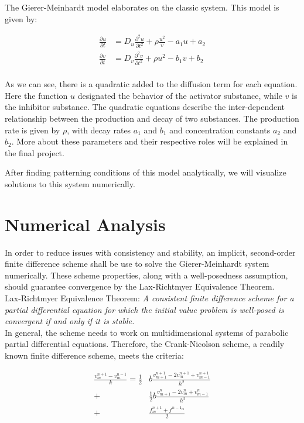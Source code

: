 \documentclass[12pt]{article}
\begin{document}
The Gierer-Meinhardt model elaborates on the classic system. This model is given by:

\begin{align*}
    \frac{\partial u}{\partial t} & = D_u\frac{\partial^2u}{\partial t^2} + \rho\frac{u^2}{v} - a_1u + a_2 \\
    \frac{\partial v}{\partial t} & = D_v\frac{\partial^2v}{\partial t^2} + \rho u^2 - b_1v + b_2 \\
\end{align*}

As we can see, there is a quadratic added to the diffusion term for each equation. Here the function $u$ designated the behavior of the activator substance, while $v$ is the inhibitor substance. The quadratic equations describe the inter-dependent relationship between the production and decay of two substances. The production rate is given by $\rho$, with decay rates $a_1$ and $b_1$ and concentration constants $a_2$ and $b_2$. More about these parameters and their respective roles will be explained in the final project.

After finding patterning conditions of this model analytically, we will visualize solutions to this system numerically.

\pagebreak

\section*{Numerical Analysis}

In order to reduce issues with consistency and stability, an implicit, second-order finite difference scheme shall be use to solve the Gierer-Meinhardt system numerically. These scheme properties, along with a well-posedness assumption, should guarantee convergence by the Lax-Richtmyer Equivalence Theorem. \\

Lax-Richtmyer Equivalence Theorem:
\textit{A consistent finite difference scheme for a partial differential equation for which the initial value problem is well-posed is convergent if and only if it is stable.} \cite{Strikwerda2004} \\

In general, the scheme needs to work on multidimensional systems of parabolic partial differential equations. Therefore, the Crank-Nicolson scheme, a readily known finite difference scheme, meets the criteria:


\begin{align*}
  \frac{v^{n+1}_m-v^{n-1}_m}{k}=\frac{1}{2} & b\frac{v^{n+1}_{m+1}-2v^{n+1}_{m}+v^{n+1}_{m-1}}{h^2} \\ +&\frac{1}{2}  b\frac{v^{n}_{m+1}-2v^{n}_{m}+v^{n}_{m-1}}{h^2} \\  +& \frac{f^{n+1}_m+f^{n-1_m}}{2}  
\end{align*}
\end{document}
